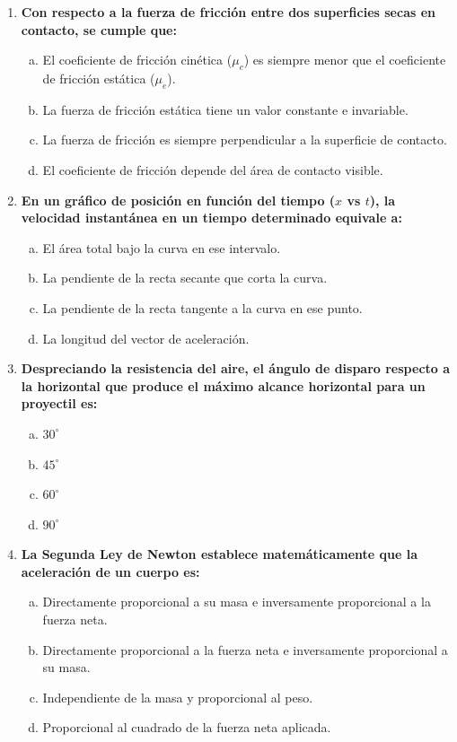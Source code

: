 \documentclass[11pt,a4paper]{article}
\begin{document}
\begin{enumerate}
    \item \textbf{Con respecto a la fuerza de fricción entre dos superficies secas en contacto, se cumple que:}
    \begin{enumerate}[a)]
        \item El coeficiente de fricción cinética ($\mu_c$) es siempre menor que el coeficiente de fricción estática ($\mu_e$).
        \item La fuerza de fricción estática tiene un valor constante e invariable.
        \item La fuerza de fricción es siempre perpendicular a la superficie de contacto.
        \item El coeficiente de fricción depende del área de contacto visible.
    \end{enumerate}

    \item \textbf{En un gráfico de posición en función del tiempo ($x$ vs $t$), la velocidad instantánea en un tiempo determinado equivale a:}
    \begin{enumerate}[a)]
        \item El área total bajo la curva en ese intervalo.
        \item La pendiente de la recta secante que corta la curva.
        \item La pendiente de la recta tangente a la curva en ese punto.
        \item La longitud del vector de aceleración.
    \end{enumerate}

    \item \textbf{Despreciando la resistencia del aire, el ángulo de disparo respecto a la horizontal que produce el máximo alcance horizontal para un proyectil es:}
    \begin{enumerate}[a)]
        \item $30^\circ$
        \item $45^\circ$
        \item $60^\circ$
        \item $90^\circ$
    \end{enumerate}

    \item \textbf{La Segunda Ley de Newton establece matemáticamente que la aceleración de un cuerpo es:}
    \begin{enumerate}[a)]
        \item Directamente proporcional a su masa e inversamente proporcional a la fuerza neta.
        \item Directamente proporcional a la fuerza neta e inversamente proporcional a su masa.
        \item Independiente de la masa y proporcional al peso.
        \item Proporcional al cuadrado de la fuerza neta aplicada.
    \end{enumerate}

\end{enumerate}
\end{document}
